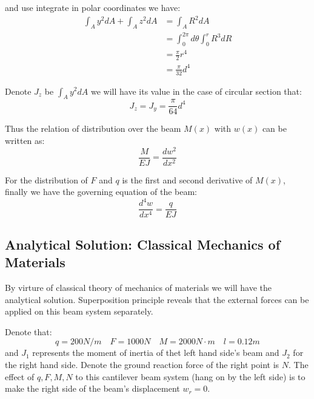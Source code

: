 and use integrate in polar coordinates we have:
\begin{equation}
    \begin{aligned}
        \int_A y^2 dA+\int_A z^2 dA
        &=
        \int_A
        R^2
        dA
        \\
        &=\int_0^{2\pi}d\theta
        \int_0^r R^3dR\\
        &=\frac{\pi}{2}r^4\\
        &=
        \frac{\pi}{32}d^4
    \end{aligned}
\end{equation}

Denote $J_z$ be $\int_A y^2 dA$ we will have its value in the case of circular section that:
\begin{equation}
    J_z=J_y = \frac{\pi}{64}d^4
\end{equation}

Thus the relation of distribution over the beam $M(x)$ with $w(x)$ can be written as:
\begin{equation}
    \label{w''}
    \frac{M}{EJ} = \frac{dw^2}{dx^2}
\end{equation}

For the distribution of $F$ and $q$ is the first and second derivative of $M(x)$, 
finally we have the governing equation of the beam:
\begin{equation}
    \frac{d^4w}{dx^4} = \frac{q}{EJ}
\end{equation}

\subsection{Analytical Solution: Classical Mechanics of Materials}

By virture of classical theory of mechanics of materials we will have the analytical solution. 
Superposition principle reveals that the external forces can be applied on this beam system 
separately.

Denote that:
\begin{equation}
    q=200N/m\quad F=1000N\quad M=2000N\cdot m\quad l=0.12m
\end{equation}
and $J_1$ represents the moment of inertia of thet left hand side's beam and $J_2$ for the right hand side. 
Denote the ground reaction force of the right point is $N$. 
The effect of $q,F,M,N$ to this cantilever beam system (hang on by the left side) is to 
make the right side of the beam's displacement $w_r=0$.

